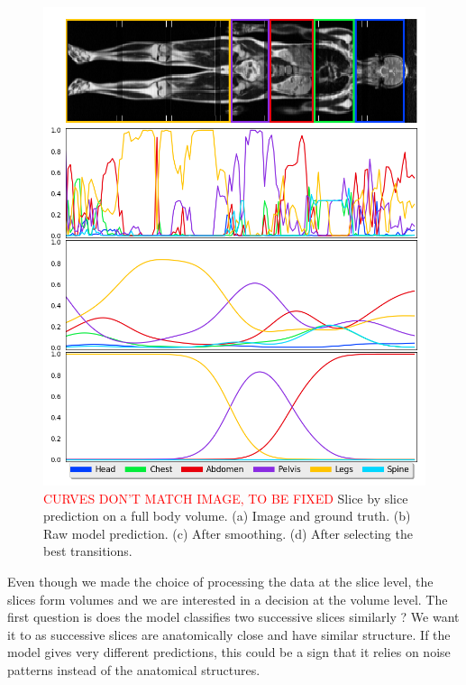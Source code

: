 \begin{figure}[htbp]
	\centering
	\includegraphics[width=\linewidth]{img_hyperopt/fullbody}
	\caption{\textcolor{red}{CURVES DON'T MATCH IMAGE, TO BE FIXED} Slice by slice prediction on a full body volume. (a) Image and ground truth. (b) Raw model prediction. (c) After smoothing. (d) After selecting the best transitions.}
	\label{fig:full_body}
\end{figure}

Even though we made the choice of processing the data at the slice level, the slices form volumes and we are interested in a decision at the volume level. The first question is does the model classifies two successive slices similarly ? We want it to as successive slices are anatomically close and have similar structure. If the model gives very different predictions, this could be a sign that it relies on noise patterns instead of the anatomical structures.

